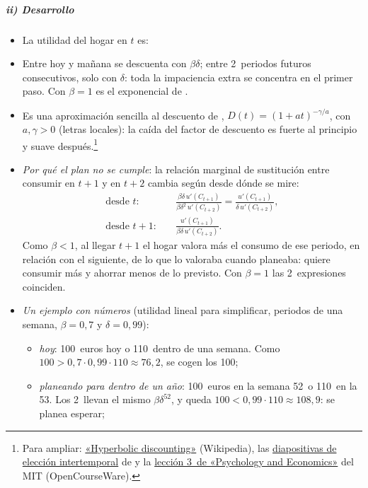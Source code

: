 \documentclass[11pt]{article}
\begin{document}
\subparagraph{ii) Desarrollo}

\begin{itemize}
\item La utilidad del hogar en $t$ es:
\item Entre hoy y mañana se descuenta con $\beta\delta$; entre 2~periodos futuros consecutivos, solo con $\delta$: toda la impaciencia extra se concentra en el primer paso. Con $\beta=1$ es el exponencial de \textcite{Samuelson1937}.
\item Es una aproximación sencilla al descuento  de \textcite{LoewensteinPrelec1992}, $D(t)=(1+at)^{-\gamma/a}$, con $a,\gamma>0$ (letras locales): la caída del factor de descuento es fuerte al principio y suave después.\footnote{Para ampliar: \href{https://en.wikipedia.org/wiki/Hyperbolic_discounting}{«Hyperbolic discounting»} (Wikipedia), las \href{https://mark-hurlstone.github.io/Week\%207.\%20Intertemporal\%20Choice.pdf}{diapositivas de elección intertemporal} de  y la \href{https://ocw.mit.edu/courses/14-13-psychology-and-economics-spring-2020/resources/lec3-time-pref-theory-i/}{lección 3~de «Psychology and Economics»} del MIT (OpenCourseWare).}
\item \emph{Por qué el plan no se cumple}: la relación marginal de sustitución entre consumir en $t+1$ y en $t+2$ cambia según desde dónde se mire:
  \begin{align*}
  \text{desde } t:&\quad \frac{\beta\delta\,u'(C_{t+1})}{\beta\delta^{2}\,u'(C_{t+2})}=\frac{u'(C_{t+1})}{\delta\,u'(C_{t+2})},\\
  \text{desde } t+1:&\quad \frac{u'(C_{t+1})}{\beta\delta\,u'(C_{t+2})}.
  \end{align*}
  Como $\beta<1$, al llegar $t+1$ el hogar valora más el consumo de ese periodo, en relación con el siguiente, de lo que lo valoraba cuando planeaba: quiere consumir más y ahorrar menos de lo previsto. Con $\beta=1$ las 2~expresiones coinciden.
\item \emph{Un ejemplo con números} (utilidad lineal para simplificar, periodos de una semana, $\beta=0{,}7$ y $\delta=0{,}99$):
  \begin{itemize}
  \item \emph{hoy}: 100~euros hoy o 110~dentro de una semana. Como $100>0{,}7\cdot0{,}99\cdot110\approx76{,}2$, se cogen los 100;
  \item \emph{planeando para dentro de un año}: 100~euros en la semana 52~o 110~en la 53. Los 2~llevan el mismo $\beta\delta^{52}$, y queda $100<0{,}99\cdot110\approx108{,}9$: se planea esperar;

\end{itemize}
\end{itemize}
\end{document}
